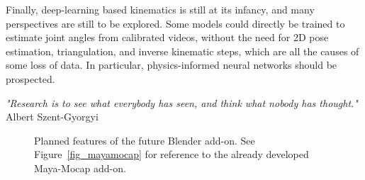 Finally, deep-learning based kinematics is still at its infancy, and many perspectives are still to be explored. Some models could directly be trained to estimate joint angles from calibrated videos, without the need for 2D pose estimation, triangulation, and inverse kinematic steps, which are all the causes of some loss of data. In particular, physics-informed neural networks should be prospected.



\vspace*{\fill}
\begin{flushright}
\textit{"Research is to see what everybody has seen, and think what nobody has thought."} \\
Albert Szent-Gyorgyi
\end{flushright}


\begin{figure}[hbtp]
      \centering
      \caption{Planned features of the future Blender add-on. See Figure~\ref{fig_mayamocap} for reference to the already developed Maya-Mocap add-on.}
      \label{fig_blendermocap}
\end{figure}





